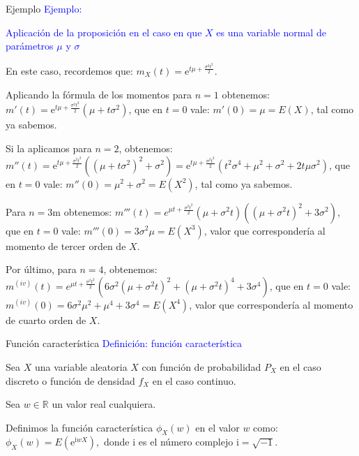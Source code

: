 \documentclass[
  ignorenonframetext,
  aspectratio=169]{beamer}
\newcommand\blue[1]{\textcolor{blue}{#1}}
\begin{document}
\begin{frame}{Ejemplo}
\protect\hypertarget{ejemplo-2}{}
\blue{Ejemplo:}

\blue{Aplicación de la proposición en el caso en que $X$ es una variable normal de parámetros $\mu$ y $\sigma$}

En este caso, recordemos que:
\(m_X (t)=\mathrm{e}^{ t \mu +\frac{\sigma^2 t^2}{2}}.\)

Aplicando la fórmula de los momentos para \(n=1\) obtenemos:
\(m'(t)=\mathrm{e}^{ t \mu +\frac{\sigma^2 t^2}{2}} \left(\mu+t\sigma^2\right)\),
que en \(t=0\) vale: \(m'(0)=\mu=E(X)\), tal como ya sabemos.

Si la aplicamos para \(n=2\), obtenemos:
\(m''(t)=\mathrm{e}^{ t \mu +\frac{\sigma^2 t^2}{2}} \left((\mu+t\sigma^2)^2+ \sigma^2 \right) =\mathrm{e}^{ t \mu +\frac{\sigma^2 t^2}{2}} \left(t^2\sigma^4+\mu^2+\sigma^2+ 2t\mu\sigma^2 \right)\),
que en \(t=0\) vale: \(m''(0)=\mu^2+\sigma^2=E\left(X^2\right)\), tal
como ya sabemos.

Para \(n=3\)m obtenemos:
\(m'''(t)=e^{\mu t+\frac{\sigma ^2 t^2}{2}}\left(\mu +\sigma ^2 t\right) \left(\left(\mu +\sigma ^2 t\right)^2+3 \sigma ^2\right)\),
que en \(t=0\) vale: \(m'''(0)=3\sigma^2\mu = E\left(X^3\right)\), valor
que correspondería al momento de tercer orden de \(X\).

Por último, para \(n=4\), obtenemos:
\(m^{(iv)}(t)=e^{\mu t+\frac{\sigma ^2 t^2}{2}}  \left(6 \sigma ^2 \left(\mu  +\sigma ^2 t\right)^2+\left(\mu  +\sigma ^2 t\right)^4+3 \sigma  ^4\right)\),
que en \(t=0\) vale:
\(m^{(iv)}(0)=6\sigma^2\mu^2+\mu^4+3\sigma^4=E\left(X^4\right)\), valor
que correspondería al momento de cuarto orden de \(X\).
\end{frame}

\begin{frame}{Función característica}
\protect\hypertarget{funciuxf3n-caracteruxedstica}{}
\blue{Definición: función característica}

Sea \(X\) una variable aleatoria \(X\) con función de probabilidad
\(P_X\) en el caso discreto o función de densidad \(f_X\) en el caso
continuo.

Sea \(w\in\mathbb{R}\) un valor real cualquiera.

Definimos la función característica \(\phi_X(w)\) en el valor \(w\)
como: \(\phi_X(w)=E\left(\mathrm{e}^{\mathrm{i} w X}\right),\) donde
\(\mathrm{i}\) es el número complejo \(\mathrm{i}=\sqrt{-1}\).
\end{frame}
\end{document}
